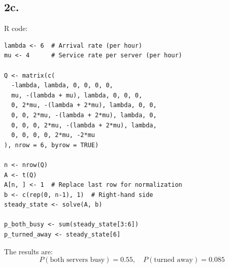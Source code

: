 \documentclass[12pt]{article}
\begin{document}
\subsection*{2c.}

R code:

\begin{verbatim}
lambda <- 6  # Arrival rate (per hour)
mu <- 4      # Service rate per server (per hour)

Q <- matrix(c(
  -lambda, lambda, 0, 0, 0, 0,
  mu, -(lambda + mu), lambda, 0, 0, 0,
  0, 2*mu, -(lambda + 2*mu), lambda, 0, 0,
  0, 0, 2*mu, -(lambda + 2*mu), lambda, 0,
  0, 0, 0, 2*mu, -(lambda + 2*mu), lambda,
  0, 0, 0, 0, 2*mu, -2*mu
), nrow = 6, byrow = TRUE)

n <- nrow(Q)
A <- t(Q)
A[n, ] <- 1  # Replace last row for normalization
b <- c(rep(0, n-1), 1)  # Right-hand side
steady_state <- solve(A, b)

p_both_busy <- sum(steady_state[3:6])  
p_turned_away <- steady_state[6]       
\end{verbatim}

The results are:
\[
P(\text{both servers busy}) = 0.55, \quad P(\text{turned away}) = 0.085
\]
\end{document}
